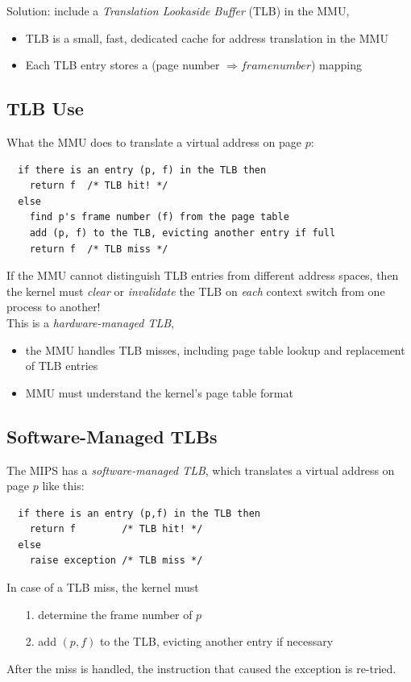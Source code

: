 \documentclass[12pt]{article}
\theoremstyle{plain}
\theoremstyle{definition}
\begin{document}
Solution: include a \emph{Translation Lookaside Buffer} (TLB) in the MMU,
\begin{itemize}
  \item TLB is a small, fast, dedicated cache for address translation in the MMU
  \item Each TLB entry stores a (page number $\Rightarrow frame number$) mapping
\end{itemize}

\subsection{TLB Use}
What the MMU does to translate a virtual address on page $p$:
\begin{verbatim}
  if there is an entry (p, f) in the TLB then
    return f  /* TLB hit! */
  else
    find p's frame number (f) from the page table
    add (p, f) to the TLB, evicting another entry if full
    return f  /* TLB miss */
\end{verbatim}
If the MMU cannot distinguish TLB entries from different address spaces, then the kernel must \emph{clear} or \emph{invalidate} the TLB on \emph{each} context switch from one process to another! \\

This is a \emph{hardware-managed TLB},
\begin{itemize}
  \item the MMU handles TLB misses, including page table lookup and replacement of TLB entries
  \item MMU must understand the kernel's page table format
\end{itemize}

\subsection{Software-Managed TLBs}
The MIPS has a \emph{software-managed TLB}, which translates a virtual address on page $p$ like this:
\begin{verbatim}
  if there is an entry (p,f) in the TLB then
    return f        /* TLB hit! */
  else
    raise exception /* TLB miss */
\end{verbatim}
In case of a TLB miss, the kernel must
\begin{enumerate}
  \item[1.] determine the frame number of $p$
  \item[2.] add $(p, f)$ to the TLB, evicting another entry if necessary
\end{enumerate}
After the miss is handled, the instruction that caused the exception is re-tried.
\end{document}
